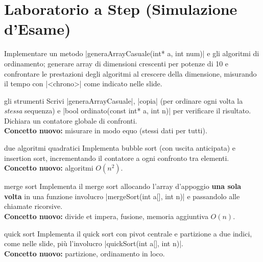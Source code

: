\section{Laboratorio a Step (Simulazione d'Esame)}

\begin{traccia}
Implementare un metodo \cc|generaArrayCasuale(int* a, int num)| e gli algoritmi
di ordinamento; generare array di dimensioni crescenti per potenze di 10 e
confrontare le prestazioni degli algoritmi al crescere della dimensione, misurando
il tempo con \cc|<chrono>| come indicato nelle slide.
\end{traccia}

\begin{step}{gli strumenti}
Scrivi \cc|generaArrayCasuale|, \cc|copia| (per ordinare ogni volta la
\emph{stessa} sequenza) e \cc|bool ordinato(const int* a, int n)| per verificare il
risultato. Dichiara un contatore globale di confronti.\\[0.3em]
\textbf{Concetto nuovo:} misurare in modo equo (stessi dati per tutti).
\end{step}

\begin{step}{due algoritmi quadratici}
Implementa bubble sort (con uscita anticipata) e insertion sort, incrementando il
contatore a ogni confronto tra elementi.\\[0.3em]
\textbf{Concetto nuovo:} algoritmi $O(n^2)$.
\end{step}

\begin{step}{merge sort}
Implementa il merge sort allocando l'array d'appoggio \textbf{una sola volta} in una
funzione involucro \cc|mergeSort(int a[], int n)| e passandolo alle chiamate
ricorsive.\\[0.3em]
\textbf{Concetto nuovo:} divide et impera, fusione, memoria aggiuntiva $O(n)$.
\end{step}

\begin{step}{quick sort}
Implementa il quick sort con pivot centrale e partizione a due indici, come nelle
slide, più l'involucro \cc|quickSort(int a[], int n)|.\\[0.3em]
\textbf{Concetto nuovo:} partizione, ordinamento in loco.
\end{step}

